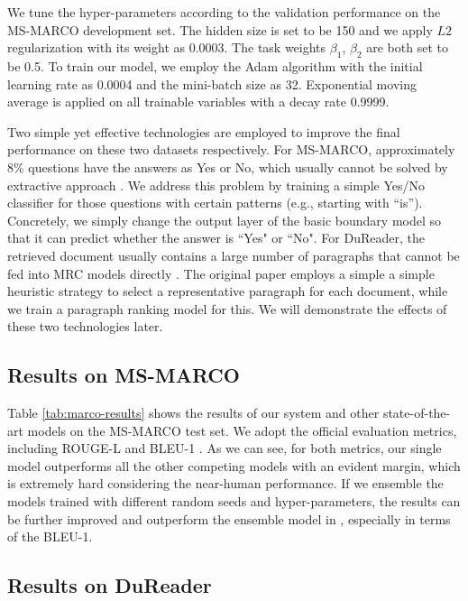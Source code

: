 \documentclass[11pt,a4paper]{article}
\newcommand{\tabref}[1]{Table \ref{#1}}
\begin{document}
We tune the hyper-parameters according to the validation performance on the MS-MARCO development set. The hidden size is set to be 150 and we apply $L2$ regularization with its weight as 0.0003. The task weights $\beta_{1}$, $\beta_{2}$ are both set to be 0.5. To train our model, we employ the Adam algorithm \cite{adam} with the initial learning rate as 0.0004 and the mini-batch size as 32. Exponential moving average is applied on all trainable variables with a decay rate 0.9999.

Two simple yet effective technologies are employed to improve the final performance on these two datasets respectively. For MS-MARCO, approximately 8\% questions have the answers as Yes or No, which usually cannot be solved by extractive approach \cite{snet}. We address this problem by training a simple Yes/No classifier for those questions with certain patterns (e.g., starting with ``is''). Concretely, we simply change the output layer of the basic boundary model so that it can predict whether the answer is ``Yes" or ``No". For DuReader, the retrieved document usually contains a large number of paragraphs that cannot be fed into MRC models directly \cite{dureader}. The original paper employs a simple a simple heuristic strategy to select a representative paragraph for each document, while we train a paragraph ranking model for this. We will demonstrate the effects of these two technologies later.


    
\subsection{Results on MS-MARCO}

\tabref{tab:marco-results} shows the results of our system and other state-of-the-art models on the MS-MARCO test set. We adopt the official evaluation metrics, including ROUGE-L \cite{rouge} and BLEU-1 \cite{bleu}. As we can see, for both metrics, our single model outperforms all the other competing models with an evident margin, which is extremely hard considering the near-human performance. If we ensemble the models trained with different random seeds and hyper-parameters, the results can be further improved and outperform the ensemble model in , especially in terms of the BLEU-1. 


\subsection{Results on DuReader}
\end{document}
